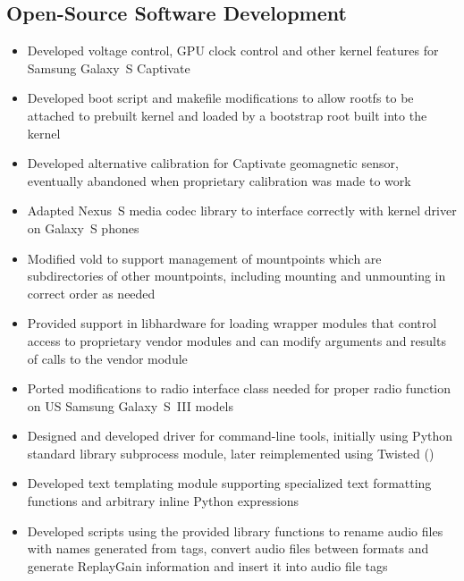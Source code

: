 \documentclass[11pt,a4paper,sans]{moderncv}
\begin{document}
\subsection{Open-Source Software Development}
\begin{itemize}
    \item Developed voltage control, GPU clock control and other kernel features for Samsung Galaxy~S Captivate
    \item Developed boot script and makefile modifications to allow rootfs to be attached to prebuilt kernel and loaded by a bootstrap root built into the kernel
    \item Developed alternative calibration for Captivate geomagnetic sensor, eventually abandoned when proprietary calibration was made to work
    \item Adapted Nexus~S media codec library to interface correctly with kernel driver on Galaxy~S phones
    \item Modified vold to support management of mountpoints which are subdirectories of other mountpoints, including mounting and unmounting in correct order as needed
    \item Provided support in libhardware for loading wrapper modules that control access to proprietary vendor modules and can modify arguments and results of calls to the vendor module
    \item Ported modifications to radio interface class needed for proper radio function on US Samsung Galaxy~S~III models
\end{itemize}
\begin{itemize}
    \item Designed and developed driver for command-line tools, initially using Python standard library subprocess module, later reimplemented using Twisted ()
    \item Developed text templating module supporting specialized text formatting functions and arbitrary inline Python expressions
    \item Developed scripts using the provided library functions to rename audio files with names generated from tags, convert audio files between formats and generate ReplayGain information and insert it into audio file tags
\end{itemize}
\end{document}
